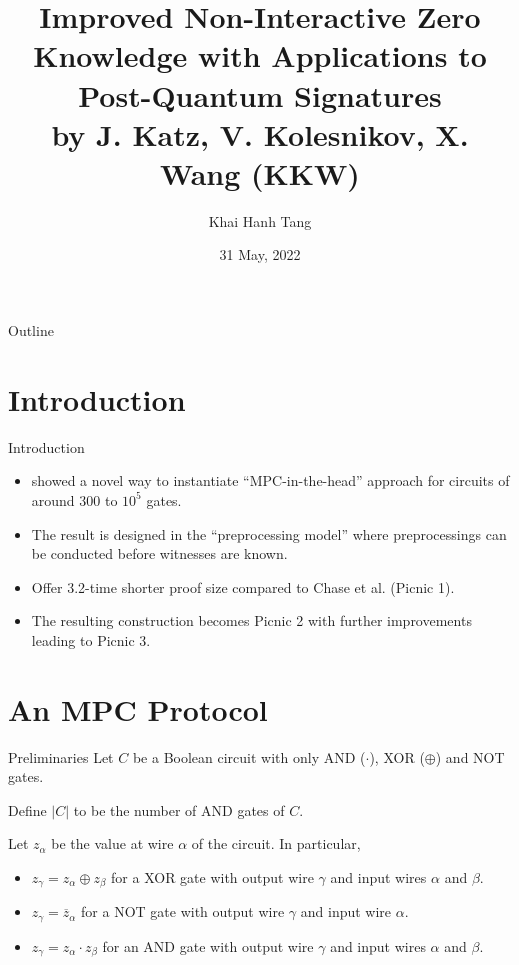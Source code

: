 \documentclass{beamer}
\title{Improved Non-Interactive Zero Knowledge with Applications to Post-Quantum Signatures\\ by  J. Katz, V. Kolesnikov, X. Wang (KKW)}
\author{Khai Hanh Tang}
\date{31 May, 2022}
\begin{document}
	
	\begin{frame}
		\titlepage
	\end{frame}
	
	\begin{frame}{Outline}
		\tableofcontents
		
	\end{frame}
	
	\section{Introduction}
	\begin{frame}{Introduction}
		\begin{itemize}
			\item \cite{KatzK018} showed a novel way to instantiate ``MPC-in-the-head'' approach \cite{IshaiKOS07} for circuits of around $300$ to $10^5$ gates.\pause
			
			\item The result is designed in the ``preprocessing model'' where preprocessings can be conducted before witnesses are known.\pause
			
			\item Offer 3.2-time shorter proof size compared to Chase et al. \cite{ChaseDGORRSZ17} (Picnic 1).\pause
			
			\item The resulting construction becomes Picnic 2 with further improvements \cite{KalesZ20} leading to Picnic 3.
		\end{itemize}
	\end{frame}
	
	\section{An MPC Protocol}
	\begin{frame}{Preliminaries}
		Let $C$ be a Boolean circuit with only AND ($\cdot$), XOR ($\oplus$) and NOT gates. \pause
		
		Define $\vert C \vert$ to be the number of AND gates of $C$.\pause
		
		Let $z_\alpha$ be the value at wire $\alpha$ of the circuit. In particular,\pause
		\begin{itemize}
			\item $z_\gamma = z_\alpha \oplus z_\beta$ for a XOR gate with output wire $\gamma$ and input wires $\alpha$ and $\beta$.\pause
			\item $z_\gamma = \overline{z}_\alpha$ for a NOT gate with output wire $\gamma$ and input wire $\alpha$.\pause
			\item $z_\gamma = z_\alpha \cdot z_\beta$ for an AND gate with output wire $\gamma$ and input wires $\alpha$ and $\beta$.
		\end{itemize}
	\end{frame}
\end{document}
